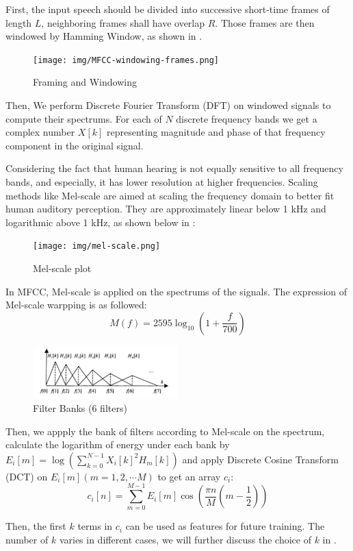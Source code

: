 First, the input speech should be divided into successive short-time frames of length $L$,
neighboring frames shall have overlap $R$.
Those frames are then windowed by Hamming Window, as shown in .
\begin{figure}
  \centering
  \texttt{[image: img/MFCC-windowing-frames.png]}
  \caption{Framing and Windowing \label{fig:framming}}
\end{figure}

Then, We perform Discrete Fourier Transform (DFT) on windowed signals to compute their spectrums.
For each of $N$ discrete frequency bands we get a complex number $X[k]$ representing
magnitude and phase of that frequency component in the original signal.

Considering the fact that human hearing is not equally sensitive to all frequency bands, and especially,
it has lower resolution at higher frequencies.
Scaling methods like Mel-scale are aimed at scaling the frequency domain to better fit human auditory perception.
They are approximately linear below 1 kHz and logarithmic above 1 kHz, as shown below in :
\begin{figure}[H]
  \centering
  \texttt{[image: img/mel-scale.png]}
  \caption{Mel-scale plot \label{fig:melscale}}
\end{figure}

In MFCC, Mel-scale is applied on the spectrums of the signals.
The expression of Mel-scale warpping is as followed:
\[ M(f) = 2595 \log_{10}(1 + \dfrac{f}{700}) \]

\begin{figure}[H]
  \centering
  \includegraphics[width=0.5\textwidth]{img/bank.png}
  \caption{Filter Banks (6 filters) \label{fig:bank}}
\end{figure}
Then,  we appply the bank of filters according to Mel-scale on the spectrum,
calculate the logarithm of energy under each bank by $E_i[m] = \log (\sum_{k=0}^{N-1}{X_i[k]^2 H_m[k]}) $ and apply Discrete
Cosine Transform (DCT) on $E_i[m](m = 1, 2, \cdots M) $ to get an array $c_i $:
\[ c_i[n] = \sum_{m=0}^{M-1}{E_i[m]\cos(\dfrac{\pi n}{M}(m - \dfrac{1}{2}))} \]

Then, the first $k$ terms in $c_i $ can be used as features for future training.
The number of $k$ varies in different cases, we will further discuss the choice of $k$ in .


